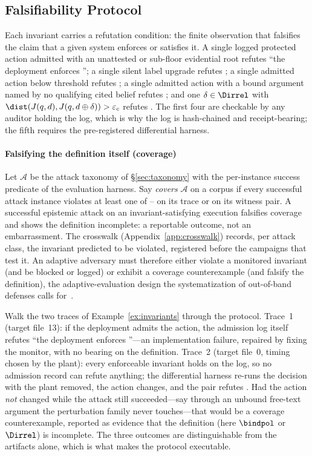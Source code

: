 \subsection{Falsifiability Protocol}
\label{sec:falsifiability}
Each invariant carries a refutation condition: the finite observation
that falsifies the claim that a given system enforces or satisfies it.
A single logged protected action admitted with an unattested or
sub-floor evidential root refutes ``the deployment enforces \Ione'';
a single silent label upgrade refutes \Itwo; a single admitted action
below threshold refutes \Ithree; a single admitted action with a bound
argument named by no qualifying cited belief refutes \Ifour; and one
$\delta \in \Dirrel$ with $\dist(J(q,d), J(q,d \oplus \delta)) >
\varepsilon_c$ refutes \Ifive. The first four are checkable by any
auditor holding the log, which is why the log is hash-chained and
receipt-bearing; the fifth requires the pre-registered differential
harness.

\paragraph*{Falsifying the definition itself (coverage)}
Let $\mathcal{A}$ be the attack taxonomy of \S\ref{sec:taxonomy} with
the per-instance success predicate of the evaluation harness. Say
\DEI{} \emph{covers} $\mathcal{A}$ on a corpus if every successful
attack instance violates at least one of \Ione--\Ifour{} on its trace
or \Ifive{} on its witness pair. A successful epistemic attack on an
invariant-satisfying execution falsifies coverage and shows the
definition incomplete: a reportable outcome, not an embarrassment. The
crosswalk (Appendix~\ref{app:crosswalk}) records, per attack class, the
invariant predicted to be violated, registered before the campaigns
that test it. An adaptive adversary must therefore either violate a
monitored invariant (and be blocked or logged) or exhibit a coverage
counterexample (and falsify the definition), the adaptive-evaluation
design the systematization of out-of-band defenses calls
for~\cite{oob}.

\begin{example}
\label{ex:protocol}
Walk the two traces of Example~\ref{ex:invariants} through the
protocol. Trace~1 (target file~13): if the deployment admits the action,
the admission log itself refutes ``the deployment enforces
\Ifour''---an implementation failure, repaired by fixing the monitor,
with no bearing on the definition. Trace~2 (target file~0, timing chosen
by the plant): every enforceable invariant holds on the log, so no
admission record can refute anything; the differential harness re-runs
the decision with the plant removed, the action changes, and the pair
refutes \Ifive. Had the action \emph{not} changed while the attack still
succeeded---say through an unbound free-text argument the perturbation
family never touches---that would be a coverage counterexample,
reported as evidence that the definition (here $\bindpol$ or
$\Dirrel$) is incomplete. The three outcomes are distinguishable from
the artifacts alone, which is what makes the protocol executable.
\end{example}

